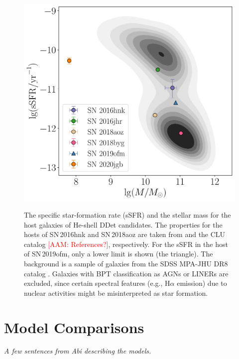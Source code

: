 \documentclass[twocolumn]{aastex631}
\newcommand{\adam}[1]{\textcolor{red}{[AAM: #1]}}
\begin{document}
\begin{figure}
    \centering
    \includegraphics[width=\linewidth]{host.pdf}
    \label{fig:host}
    \caption{The specific star-formation rate (sSFR) and the stellar mass for the host galaxies of He-shell DDet candidates. The properties for the hosts of SN\,2016hnk and SN\,2018aoz are taken from \citet{galbany_16hnk_2019} and the CLU catalog \adam{References?}, respectively. For the sSFR in the host of SN\,2019ofm, only a lower limit is shown (the triangle). The background is a sample of galaxies from the SDSS MPA-JHU DR8 catalog \citep{Kauffmann_SDSS_2003,Brinchmann_SDSS_2004}. Galaxies with BPT classification as AGNs or LINERs are excluded, since certain spectral features (e.g., H$\alpha$ emission) due to nuclear activities might be misinterpreted as star formation.}
\end{figure}

\section{Model Comparisons} \label{sec:model}
{\it A few sentences from Abi describing the models.}
\end{document}
